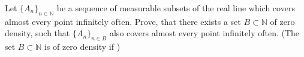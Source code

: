 Let $ \{A_n\}_{n \in \mathbb{N}}$ be a sequence of measurable subsets of the real line which covers almost every point infinitely often. Prove, that there exists a set $ B \subset \mathbb{N}$ of zero density, such that $ \{A_n\}_{n \in B}$ also covers almost every point infinitely often. (The set $ B \subset \mathbb{N}$ is of zero density if )